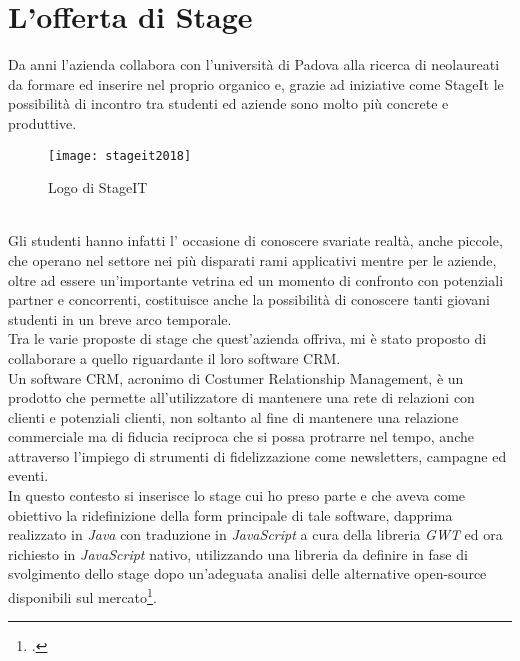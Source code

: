 \section{L'offerta di Stage}
Da anni l'azienda collabora con l'università di Padova alla ricerca di neolaureati da formare ed inserire nel proprio organico e, grazie ad iniziative come StageIt le possibilità di incontro tra studenti ed aziende sono molto più concrete e produttive.\\
\begin{figure}[h]
\centering
\texttt{[image: stageit2018]}
\caption{Logo di StageIT}
\end{figure}\\ 
Gli studenti hanno infatti l' occasione di conoscere svariate realtà, anche piccole, che operano nel settore nei più disparati rami applicativi mentre per le aziende, oltre ad essere un'importante vetrina ed un momento di confronto con potenziali partner e concorrenti, costituisce anche la possibilità di conoscere tanti giovani studenti in un breve arco temporale.\\
Tra le varie proposte di stage che quest'azienda offriva, mi è stato proposto di collaborare a quello riguardante il loro software CRM.\\
Un software CRM, acronimo di Costumer Relationship Management, è un prodotto che permette all'utilizzatore di mantenere una rete di relazioni con clienti e potenziali clienti, non soltanto al fine di mantenere una relazione commerciale ma di fiducia reciproca che si possa protrarre nel tempo, anche attraverso l'impiego di strumenti di fidelizzazione come newsletters, campagne ed eventi. \\
In questo contesto si inserisce  lo stage cui ho preso parte e che aveva come obiettivo la ridefinizione della form principale di tale software, dapprima realizzato in \emph{Java} con traduzione in \emph{JavaScript} a cura della libreria \emph{GWT} ed ora richiesto in \emph{JavaScript} nativo, utilizzando una libreria da definire in fase di svolgimento dello stage dopo un'adeguata analisi delle alternative open-source disponibili sul mercato\footcite{queste ed altre tecnologie verranno discusse nel dettaglio nei capitoli seguenti}. 

